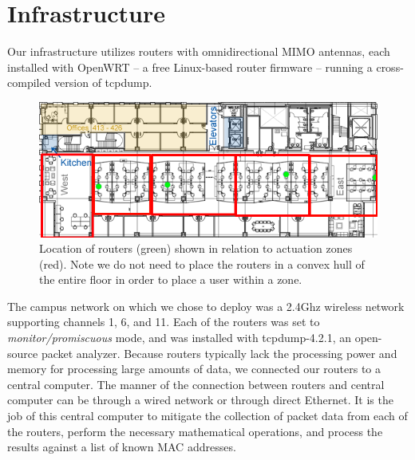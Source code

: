 \section{Infrastructure}
Our infrastructure utilizes routers with omnidirectional MIMO antennas, each installed with OpenWRT -- a free Linux-based router firmware -- running a cross-compiled version of tcpdump.
\begin{figure}[htb]
\begin{center}
\includegraphics[width=\linewidth]{figs/floor4}
\end{center}
\caption{Location of routers (green) shown in relation to actuation zones (red). Note we do not need to place the routers in a convex hull of the entire floor in order to place a user within a zone.}
\end{figure}

The campus network on which we chose to deploy was a 2.4Ghz wireless network supporting channels 1, 6, and 11. Each of the routers was set to \emph{monitor/promiscuous} mode, and was installed with tcpdump-4.2.1, an open-source packet analyzer. Because routers typically lack the processing power and memory for processing large amounts of data, we connected our routers to a central computer. The manner of the connection between routers and central computer can be through a wired network or through direct Ethernet. It is the job of this central computer to mitigate the collection of packet data from each of the routers, perform the necessary mathematical operations, and process the results against a list of known MAC addresses. 

